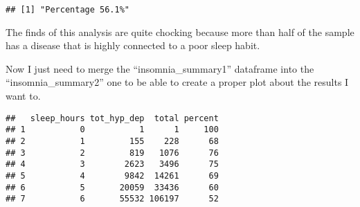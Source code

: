 \documentclass[
]{article}
\newenvironment{Shaded}{\begin{snugshade}}{\end{snugshade}}
\newcommand{\AttributeTok}[1]{\textcolor[rgb]{0.77,0.63,0.00}{#1}}
\newcommand{\DecValTok}[1]{\textcolor[rgb]{0.00,0.00,0.81}{#1}}
\newcommand{\FunctionTok}[1]{\textcolor[rgb]{0.00,0.00,0.00}{#1}}
\newcommand{\NormalTok}[1]{#1}
\newcommand{\OtherTok}[1]{\textcolor[rgb]{0.56,0.35,0.01}{#1}}
\newcommand{\SpecialCharTok}[1]{\textcolor[rgb]{0.00,0.00,0.00}{#1}}
\newcommand{\StringTok}[1]{\textcolor[rgb]{0.31,0.60,0.02}{#1}}
\begin{document}
\begin{Shaded}
\end{Shaded}

\begin{verbatim}
## [1] "Percentage 56.1%"
\end{verbatim}

The finds of this analysis are quite chocking because more than half of
the sample has a disease that is highly connected to a poor sleep habit.

Now I just need to merge the ``insomnia\_summary1'' dataframe into the
``insomnia\_summary2'' one to be able to create a proper plot about the
results I want to.

\begin{Shaded}
\end{Shaded}

\begin{verbatim}
##   sleep_hours tot_hyp_dep  total percent
## 1           0           1      1     100
## 2           1         155    228      68
## 3           2         819   1076      76
## 4           3        2623   3496      75
## 5           4        9842  14261      69
## 6           5       20059  33436      60
## 7           6       55532 106197      52
\end{verbatim}
\end{document}
